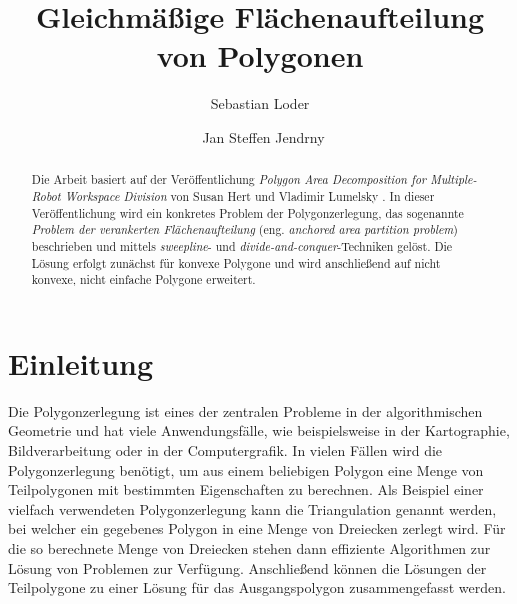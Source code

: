 \documentclass[ngerman]{seminarbeitrag}
\begin{document}
\title{Gleichmäßige Flächenaufteilung von Polygonen}
\author{Sebastian Loder\and\ Jan Steffen Jendrny}

\maketitle%

\begin{abstract}
Die Arbeit basiert auf der Veröffentlichung \emph{Polygon Area Decomposition for Multiple-Robot Workspace Division} von Susan Hert und Vladimir Lumelsky \cite{Hert.1998}.
In dieser Veröffentlichung wird ein konkretes Problem der Polygonzerlegung, das sogenannte \emph{Problem der verankerten Flächenaufteilung} (eng. \emph{anchored
area partition problem}) beschrieben und mittels \emph{sweepline}- und \emph{divide-and-conquer}-Techniken gelöst. Die Lösung erfolgt zunächst für konvexe Polygone und wird anschließend auf nicht konvexe, nicht einfache Polygone erweitert.

\end{abstract}

\section{Einleitung}\label{einleitung}
Die Polygonzerlegung ist eines der zentralen Probleme in der algorithmischen Geometrie und hat viele Anwendungsfälle, wie beispielsweise in der Kartographie,
Bildverarbeitung oder in der Computergrafik. In vielen Fällen wird die Polygonzerlegung benötigt, um aus einem beliebigen Polygon eine Menge von Teilpolygonen mit bestimmten
Eigenschaften zu berechnen. Als Beispiel einer vielfach verwendeten Polygonzerlegung kann die Triangulation genannt werden, bei welcher ein gegebenes Polygon in eine Menge von Dreiecken
zerlegt wird. Für die so berechnete Menge von Dreiecken stehen dann effiziente Algorithmen zur Lösung von Problemen zur Verfügung. Anschließend können die Lösungen der Teilpolygone zu
einer Lösung für das Ausgangspolygon zusammengefasst werden. \\
\end{document}
